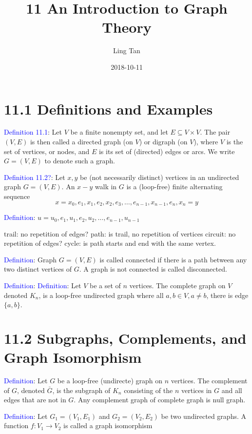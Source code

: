 \documentclass[a4paper]{article}
\title{11 An Introduction to Graph Theory}
\author{Ling Tan}
\date{2018-10-11}
\begin{document}
\maketitle

\section*{11.1 Definitions and Examples}
\textcolor{blue}{Definition 11.1}: Let $V$ be a finite nonempty set, and let $E\subseteq V\times V$. The pair $(V,E)$ is then called a directed graph (on $V$) or digraph (on $V$), where $V$ is the set of vertices, or nodes, and $E$ is its set of (directed) edges or arcs. We write $G=(V,E)$ to denote such a graph.

\textcolor{blue}{Definition 11.2?}: Let $x,y$ be (not necessarily distinct) vertices in an undirected graph $G=(V,E)$. An $x-y$ walk in $G$ is a (loop-free) finite alternating sequence
$$
x=x_0,e_1,x_1,e_2,x_2,e_3,\ldots,e_{n-1},x_{n-1},e_n,x_n=y
$$

\textcolor{blue}{Definition}: $u=u_0, e_1, u_1, e_2, u_2, \ldots, e_{n-1},u_{n-1}$

trail: no repetition of edges?
path: is trail, no repetition of vertices
circuit: no repetition of edges?
cycle: is path starts and end with the same vertex.

\textcolor{blue}{Definition}: Graph $G=(V,E)$ is called connected if there is a path between any two distinct vertices of $G$. A graph is not connected is called disconnected.

\textcolor{blue}{Definition}: 
\textcolor{blue}{Definition}: Let $V$ be a set of $n$ vertices. The complete graph on $V$ denoted $K_n$, is a loop-free undirected graph where all $a,b\in V, a\neq b$, there is edge $\{a,b\}$.


\section*{11.2 Subgraphs, Complements, and Graph Isomorphism}
\textcolor{blue}{Definition}: Let $G$ be a loop-free (undirecte) graph on $n$ vertices. The complement of $G$, denoted $\bar G$, is the subgraph of $K_n$ consisting of the $n$ vertices in $G$ and all edges that are not in $G$. Any complement graph of complete graph is null graph.


\textcolor{blue}{Definition}: Let $G_1=(V_1,E_1)$ and $G_2=(V_2,E_2)$ be two undirected graphs. A function $f:V_1\rightarrow V_2$ is called a graph isomorphism
\end{document}
